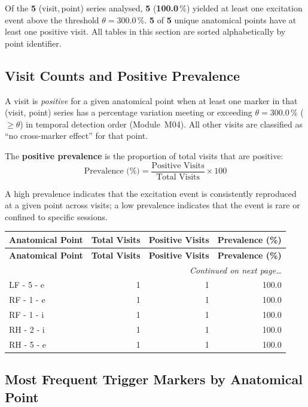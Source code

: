 \documentclass[a4paper,11pt]{article}
\begin{document}
\noindent
Of the \textbf{5} (visit,\,point) series analysed,
\textbf{5} (\textbf{100.0}\,\%) yielded at least one
excitation event above the threshold $\theta = 300.0\,\%$.
\textbf{5} of \textbf{5} unique anatomical points
have at least one positive visit.
All tables in this section are sorted alphabetically by point identifier.

\subsection{Visit Counts and Positive Prevalence}

A visit is \emph{positive} for a given anatomical point when at least one marker in that
(visit, point) series has a percentage variation meeting or exceeding
$\theta = 300.0\,\%$ ($\geq \theta$) in temporal detection order (Module~M04).
All other visits are classified as ``no cross-marker effect'' for that point.

The \textbf{positive prevalence} is the proportion of total visits that are positive:
\[
  \text{Prevalence (\%)} = \frac{\text{Positive Visits}}{\text{Total Visits}} \times 100
\]

A high prevalence indicates that the excitation event is consistently reproduced at a given
point across visits; a low prevalence indicates that the event is rare or confined to
specific sessions.

\begin{small}
\begin{longtable}{p{5cm}rrr}
\toprule
\textbf{Anatomical Point} &
\textbf{Total Visits} &
\textbf{Positive Visits} &
\textbf{Prevalence (\%)} \\
\midrule
\endfirsthead
\toprule
\textbf{Anatomical Point} &
\textbf{Total Visits} &
\textbf{Positive Visits} &
\textbf{Prevalence (\%)} \\
\midrule
\endhead
\midrule
\multicolumn{4}{r}{\small\emph{Continued on next page\ldots}} \\
\endfoot
\bottomrule
\endlastfoot
LF - 5 - e & 1 & 1 & 100.0 \\
RF - 1 - e & 1 & 1 & 100.0 \\
RF - 1 - i & 1 & 1 & 100.0 \\
RH - 2 - i & 1 & 1 & 100.0 \\
RH - 5 - e & 1 & 1 & 100.0 \\
\end{longtable}
\end{small}

\subsection{Most Frequent Trigger Markers by Anatomical Point}
\end{document}
